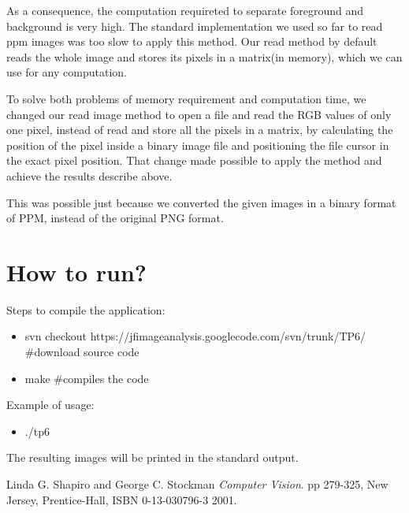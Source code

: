 \documentclass{article}
\begin{document}
	As a consequence, the computation requireted to separate foreground and background is very high. The standard implementation we used so far to read ppm images was too slow to apply this method. Our read method by default reads the whole image and stores its pixels in a matrix(in memory), which we can use for any computation.

	To solve both problems of memory requirement and computation time, we changed our read image method to open a file and read the RGB values of only one pixel, instead of read and store all the pixels in a matrix, by calculating the position of the pixel inside a binary image file and positioning the file cursor in the exact pixel position. That change made possible to apply the method and achieve the results describe above.

	This was possible just because we converted the given images in a binary format of PPM, instead of the original PNG format.

\section{How to run?}

	Steps to compile the application:
	
	\begin{itemize}
		\item svn checkout https://jfimageanalysis.googlecode.com/svn/trunk/TP6/ \#download source code
		\item make \#compiles the code
	\end{itemize}


	Example of usage:

	\begin{itemize}
		\item ./tp6
	\end{itemize}

	The resulting images will be printed in the standard output.


\begin{thebibliography}{9}

	Linda G. Shapiro and George C. Stockman
 	\emph{Computer Vision}.
	pp 279-325, 
	New Jersey, Prentice-Hall, 
	ISBN 0-13-030796-3
 	2001.

\end{thebibliography}
\end{document}
